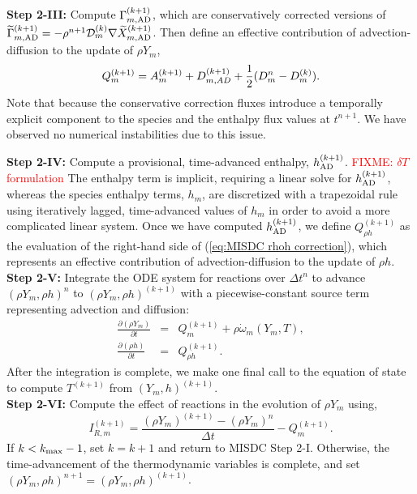 {\bf Step 2-III:} Compute $\Gamma_{m,{\rm AD}}^{(k+1)}$, which are conservatively corrected versions of 
$\widetilde\Gamma_{m,{\rm AD}}^{(k+1)} = -\rho^{n+1}\mathcal D_m^{(k)}\nabla\widetilde X_{m,{\rm AD}}^{(k+1)}$.
Then define an effective contribution of advection-diffusion to the update of $\rho Y_m$,
\begin{equation*}
  Q_{m}^{(k+1)} = A_m^{(k+1)} + D_{m,AD}^{(k+1)} + \frac{1}{2}(D_m^n - D_m^{(k)}).
\end{equation*}
Note that because the conservative correction fluxes introduce a temporally explicit component to the species and the
enthalpy flux values at $t^{n+1}$.  We have observed no numerical instabilities due to this issue.

{\bf Step 2-IV:} Compute a provisional, time-advanced enthalpy, $h_{\rm AD}^{(k+1)}$.  \textcolor{red}{FIXME: $\delta T$ formulation}
The enthalpy term is implicit, requiring a linear solve for $h_{\rm AD}^{(k+1)}$, whereas the 
species enthalpy terms, $h_m$, are discretized with a trapezoidal rule using iteratively lagged, 
time-advanced values of $h_m$ in order to avoid a more complicated linear system.
Once we have computed $h_{\rm AD}^{(k+1)}$, we define
$Q_{\rho h}^{(k+1)}$ as the evaluation of the right-hand side of (\ref{eq:MISDC rhoh correction}),
which represents an effective contribution of advection-diffusion to the update of $\rho h$.\\

{\bf Step 2-V:} Integrate the ODE system for reactions over $\Delta t^n$
to advance $(\rho Y_m,\rho h)^n$ to $(\rho Y_m,\rho h)^{(k+1)}$ with a piecewise-constant source term representing 
advection and diffusion:
\begin{eqnarray}
\frac{\partial(\rho Y_m)}{\partial t} &=& Q_{m}^{(k+1)} + \rho\dot\omega_m(Y_m,T),\label{eq:MISDC VODE 3}\\
\frac{\partial(\rho h)}{\partial t} &=& Q_{\rho h}^{(k+1)}.\label{eq:MISDC VODE 4}
\end{eqnarray}
After the integration is complete, we make one final call to the equation of state
to compute $T^{(k+1)}$ from $(Y_m,h)^{(k+1)}$.\\

{\bf Step 2-VI:} Compute the effect of reactions in the evolution of $\rho Y_m$ using,
\begin{equation}
I_{R,m}^{(k+1)} = \frac{(\rho Y_m)^{(k+1)} - (\rho Y_m)^n}{\Delta t} - Q_{m}^{(k+1)}.
\end{equation}
If $k<k_{\rm max}-1$, set $k=k+1$ and return to MISDC Step 2-I.  Otherwise, the 
time-advancement of the thermodynamic variables is complete, and set 
$(\rho Y_m,\rho h)^{n+1} = (\rho Y_m,\rho h)^{(k+1)}$.
